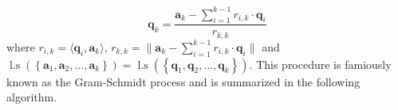 \begin{equation}\label{eq: comp_orth_basis}
    \bm{q}_k = \frac{\bm{a}_k - \sum_{i=1}^{k-1} r_{i,k} \cdot \bm{q}_i}{r_{k,k}}
\end{equation}
where $r_{i,k} = \langle \bm{q}_i, \bm{a}_k \rangle$, $r_{k,k} = \| \bm{a}_k - \sum_{i=1}^{k-1} r_{i,k} \cdot \bm{q}_i \|$ and $\operatorname{l.s} \left( \left\{ \bm{a}_1, \bm{a}_2, \ldots , \bm{a}_k \right\} \right) = \operatorname{l.s} \left( \left\{ \bm{q}_1, \bm{q}_2, \ldots , \bm{q}_k \right\} \right)$. This procedure is famiously known as the Gram-Schmidt process \cite{BerezanskyMakarovich1996FaV1,TrefethenLloydN.LloydNicholas1997Nla/,DemmelJamesW1997Anla} and is summarized in the following algorithm.




